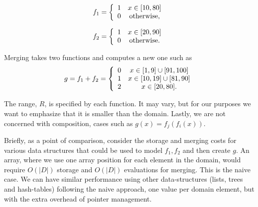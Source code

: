\documentclass{article}
\begin{document}
\begin{minipage}{.5\linewidth}
\begin{displaymath}
  f_{1} = \left\{
        \begin{array}{c c}
          1 & x \in [10,80] \\
          0 & \text{otherwise,} \\ %
        \end{array}
     \right.
\end{displaymath}
\end{minipage}%
\begin{minipage}{.5\linewidth}
\begin{displaymath}
  f_{2} = \left\{
        \begin{array}{c c}
          1 & x \in [20,90] \\
          0 & \text{otherwise.} \\ %
        \end{array}
     \right.
\end{displaymath}
\end{minipage}
Merging takes two functions and computes a new
one
such as
\begin{displaymath}
  g = f_{1}+f_{2} = \left\{
        \begin{array}{c c}
          0 & x \in [1,9] \cup [91,100] \\
          1 & x \in [10,19] \cup [81,90] \\
          2 & x \in [20,80]. \\
        \end{array}
     \right.
\end{displaymath}

The range, $R$, is specified by each function.
It may vary, but for our purposes we want to emphasize that it is smaller
than the domain.
Lastly, we are not concerned with composition,
cases such as $g(x)=f_{j}(f_{i}(x))$.

Briefly, as a point of comparison,
consider the storage and merging costs for various data
structures that could be used to model $f_{1}, f_{2}$ and then create $g$.
An array, where we use one array position for each element in the domain,
would require $O(|D|)$ storage and $O(|D|)$ evaluations for merging.
This is the naive case.
We can have similar performance using other data-structures
(lists, trees and hash-tables) following the naive approach,
one value per domain element,
but with the extra overhead of pointer management.
\end{document}
